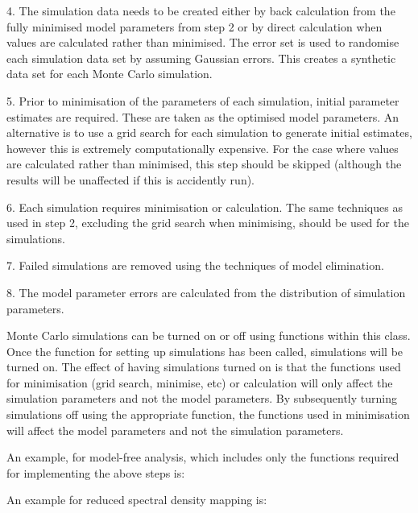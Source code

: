 4.  The simulation data needs to be created either by back calculation from the fully
minimised model parameters from step 2 or by direct calculation when values are calculated
rather than minimised.  The error set is used to randomise each simulation data set by
assuming Gaussian errors.  This creates a synthetic data set for each Monte Carlo
simulation.

5.  Prior to minimisation of the parameters of each simulation, initial parameter estimates
are required.  These are taken as the optimised model parameters.  An alternative is to use
a grid search for each simulation to generate initial estimates, however this is extremely
computationally expensive.  For the case where values are calculated rather than minimised,
this step should be skipped (although the results will be unaffected if this is accidently
run).

6.  Each simulation requires minimisation or calculation.  The same techniques as used in
step 2, excluding the grid search when minimising, should be used for the simulations.

7.  Failed simulations are removed using the techniques of model elimination.

8.  The model parameter errors are calculated from the distribution of simulation
parameters.


Monte Carlo simulations can be turned on or off using functions within this class.  Once the
function for setting up simulations has been called, simulations will be turned on.  The
effect of having simulations turned on is that the functions used for minimisation (grid
search, minimise, etc) or calculation will only affect the simulation parameters and not the
model parameters.  By subsequently turning simulations off using the appropriate function,
the functions used in minimisation will affect the model parameters and not the simulation
parameters.


An example, for model-free analysis, which includes only the functions required for
implementing the above steps is:




An example for reduced spectral density mapping is:

